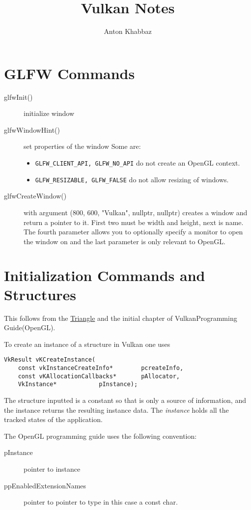 \documentclass{article}
\title{Vulkan Notes}
\author{Anton Khabbaz}
\begin{document}
\maketitle
\section{GLFW Commands}
\begin{description}
\item[ glfwInit()] initialize window
\item[glfwWindowHint()] set properties of the window Some are:
	\begin{itemize}
		\item \verb|GLFW_CLIENT_API, GLFW_NO_API| do not create an
OpenGL context.
		\item \verb|GLFW_RESIZABLE, GLFW_FALSE| do not allow resizing of
windows.
	\end{itemize}
\item [glfwCreateWindow()] with argument 
 (800, 600, "Vulkan", nullptr, nullptr) creates a window
and return a pointer to it.  First two must be width and height, next is name.
The fourth parameter allows you to optionally specify a monitor to open the
window on and the last parameter is only relevant to OpenGL.	
\end{description}
\section{Initialization Commands and Structures}
This follows from the
\href{https://vulkan-tutorial.com/en/Drawing\_a\_triangle/Setup/Instance}{Triangle}
and the initial chapter of VulkanProgramming Guide(OpenGL).  

To create an instance of a structure in Vulkan one uses
\begin{verbatim}
VkResult vKCreateInstance( 
	const vkInstanceCreateInfo*        pcreateInfo,
	const vKAllocationCallbacks*       pAllocator,
	VkInstance*			   pInstance);
\end{verbatim}

The structure inputted is a constant so that is only a source of information, and the
instance returns the resulting instance data.  The \emph{instance} holds all the
tracked states of the application.

The OpenGL programming guide uses the following convention:
\begin{description}
	\item[pInstance]  pointer to instance
	\item[ppEnabledExtensionNames] pointer to pointer to type in this case a
		const char.
\end{description}
\end{document}
